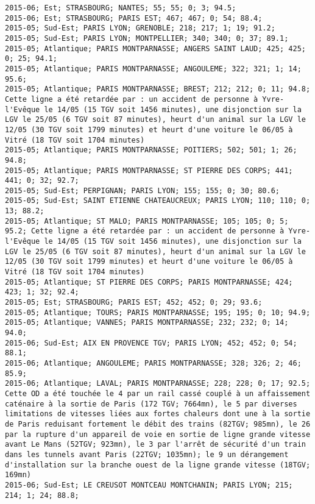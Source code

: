 \documentclass{article}
\begin{document}
\begin{Verbatim}[commandchars=\\\{\}]
2015-06; Est; STRASBOURG; NANTES; 55; 55; 0; 3; 94.5; 
2015-06; Est; STRASBOURG; PARIS EST; 467; 467; 0; 54; 88.4; 
2015-05; Sud-Est; PARIS LYON; GRENOBLE; 218; 217; 1; 19; 91.2; 
2015-05; Sud-Est; PARIS LYON; MONTPELLIER; 340; 340; 0; 37; 89.1; 
2015-05; Atlantique; PARIS MONTPARNASSE; ANGERS SAINT LAUD; 425; 425; 0; 25; 94.1; 
2015-05; Atlantique; PARIS MONTPARNASSE; ANGOULEME; 322; 321; 1; 14; 95.6; 
2015-05; Atlantique; PARIS MONTPARNASSE; BREST; 212; 212; 0; 11; 94.8; Cette ligne a été retardée par : un accident de personne à Yvre-l'Evêque le 14/05 (15 TGV soit 1456 minutes), une disjonction sur la LGV le 25/05 (6 TGV soit 87 minutes), heurt d'un animal sur la LGV le 12/05 (30 TGV soit 1799 minutes) et heurt d'une voiture le 06/05 à Vitré (18 TGV soit 1704 minutes)
2015-05; Atlantique; PARIS MONTPARNASSE; POITIERS; 502; 501; 1; 26; 94.8; 
2015-05; Atlantique; PARIS MONTPARNASSE; ST PIERRE DES CORPS; 441; 441; 0; 32; 92.7; 
2015-05; Sud-Est; PERPIGNAN; PARIS LYON; 155; 155; 0; 30; 80.6; 
2015-05; Sud-Est; SAINT ETIENNE CHATEAUCREUX; PARIS LYON; 110; 110; 0; 13; 88.2; 
2015-05; Atlantique; ST MALO; PARIS MONTPARNASSE; 105; 105; 0; 5; 95.2; Cette ligne a été retardée par : un accident de personne à Yvre-l'Evêque le 14/05 (15 TGV soit 1456 minutes), une disjonction sur la LGV le 25/05 (6 TGV soit 87 minutes), heurt d'un animal sur la LGV le 12/05 (30 TGV soit 1799 minutes) et heurt d'une voiture le 06/05 à Vitré (18 TGV soit 1704 minutes)
2015-05; Atlantique; ST PIERRE DES CORPS; PARIS MONTPARNASSE; 424; 423; 1; 32; 92.4; 
2015-05; Est; STRASBOURG; PARIS EST; 452; 452; 0; 29; 93.6; 
2015-05; Atlantique; TOURS; PARIS MONTPARNASSE; 195; 195; 0; 10; 94.9; 
2015-05; Atlantique; VANNES; PARIS MONTPARNASSE; 232; 232; 0; 14; 94.0; 
2015-06; Sud-Est; AIX EN PROVENCE TGV; PARIS LYON; 452; 452; 0; 54; 88.1; 
2015-06; Atlantique; ANGOULEME; PARIS MONTPARNASSE; 328; 326; 2; 46; 85.9; 
2015-06; Atlantique; LAVAL; PARIS MONTPARNASSE; 228; 228; 0; 17; 92.5; Cette OD a été touchée le 4 par un rail cassé couplé à un affaissement caténaire à la sortie de Paris (172 TGV; 7664mn), le 5 par diverses limitations de vitesses liées aux fortes chaleurs dont une à la sortie de Paris reduisant fortement le débit des trains (82TGV; 985mn), le 26 par la rupture d'un appareil de voie en sortie de ligne grande vitesse avant Le Mans (52TGV; 923mn), le 3 par l'arrêt de sécurité d'un train dans les tunnels avant Paris (22TGV; 1035mn); le 9 un dérangement d'installation sur la branche ouest de la ligne grande vitesse (18TGV; 169mn)
2015-06; Sud-Est; LE CREUSOT MONTCEAU MONTCHANIN; PARIS LYON; 215; 214; 1; 24; 88.8; 

\end{Verbatim}
\end{document}

